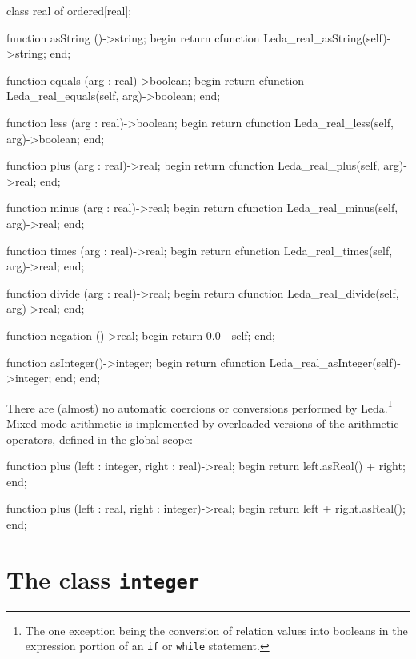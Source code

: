 \begin{cprog}

class real of ordered[real];

	function asString ()->string;
	begin
		return cfunction Leda_real_asString(self)->string;
	end;

	function equals (arg : real)->boolean;
	begin
		return cfunction
			Leda_real_equals(self, arg)->boolean;
	end;

	function less (arg : real)->boolean;
	begin
		return cfunction
			Leda_real_less(self, arg)->boolean;
	end;

	function plus (arg : real)->real;
	begin
		return cfunction
			Leda_real_plus(self, arg)->real;
	end;

	function minus (arg : real)->real;
	begin
		return cfunction
			Leda_real_minus(self, arg)->real;
	end;

	function times (arg : real)->real;
	begin
		return cfunction
			Leda_real_times(self, arg)->real;
	end;

	function divide (arg : real)->real;
	begin
		return cfunction
			Leda_real_divide(self, arg)->real;
	end;

	function negation ()->real;
	begin
		return 0.0 - self;
	end;

	function asInteger()->integer;
	begin
		return cfunction
			Leda_real_asInteger(self)->integer;
	end;
end;

\end{cprog}

There are (almost) no automatic coercions or conversions performed by
Leda.\footnote{The one exception being the conversion of relation values into
booleans in the expression portion of an {\tt if} or {\tt while} statement.}
Mixed mode arithmetic is implemented by overloaded versions of
the arithmetic operators, defined in the global scope:

\begin{cprog}

function plus (left : integer, right : real)->real;
begin
	return left.asReal() + right;
end;

function plus (left : real, right : integer)->real;
begin
	return left + right.asReal();
end;

\end{cprog}

\section{The class {\tt integer}}\label{std2}


